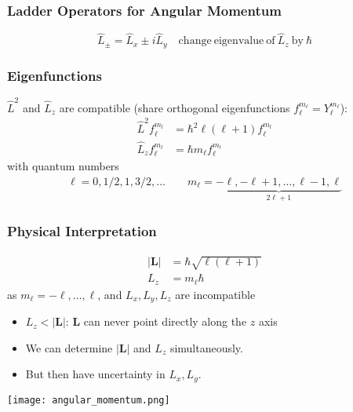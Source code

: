\subsubsection{Ladder Operators for Angular Momentum}

\noindent\begin{equation*}
    \widehat{L}_{\pm}=\widehat{L}_x\pm i \widehat{L}_y \quad \mathrm{change\ eigenvalue\ of\ } \widehat{L}_z \mathrm{\ by\ } \hbar
\end{equation*}

\subsubsection{Eigenfunctions}

$\widehat{L}^2$ and $\widehat{L}_z$ are compatible (share orthogonal eigenfunctions $f_{\ell}^{m_\ell}=Y_{\ell}^{m_\ell}$):
\begin{align*}
    \widehat{L}^2 f_{\ell}^{m_l} & =\hbar^{2}\ell (\ell+1) f_{\ell}^{m_l} \\
    \widehat{L}_z f_{\ell}^{m_l} & =\hbar m_\ell f_{\ell}^{m_l}
\end{align*}
with quantum numbers
\begin{align*}
    \ell  =0, 1/2, 1, 3/2,\ldots\qquad  m_\ell = \underbrace{-\ell, -\ell+1, \ldots, \ell-1, \ell}_{2\ell+1}
\end{align*}

\subsubsection{Physical Interpretation}
\noindent\begin{align*}
    |\mathbf{L}| & =\hbar\sqrt{\ell(\ell+1)} \\
    L_{z}        & =m_{\ell}\hbar
\end{align*}
as $m_{\ell}=-\ell,\dots,\ell$, and $L_x, L_y, L_z$ are incompatible
\begin{itemize}
    \item $L_z < |\mathbf{L}|$: $\mathbf{L}$ can never point directly along the $z$ axis
    \item We can determine $|\mathbf{L}|$ and $L_{z}$ simultaneously.
    \item But then have uncertainty in $L_x, L_y$.
\end{itemize}
\begin{center}
    \texttt{[image: angular\_momentum.png]}
\end{center}

